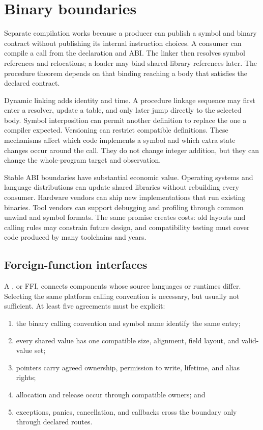 \section{Binary boundaries}

Separate compilation works because a producer can publish a symbol and binary
contract without publishing its internal instruction choices. A consumer can
compile a call from the declaration and ABI. The linker then resolves symbol
references and relocations; a loader may bind shared-library references later.
The procedure theorem depends on that binding reaching a body that satisfies
the declared contract.

Dynamic linking adds identity and time. A procedure linkage sequence may first
enter a resolver, update a table, and only later jump directly to the selected
body. Symbol interposition can permit another definition to replace the one a
compiler expected. Versioning can restrict compatible definitions. These
mechanisms affect which code implements a symbol and which extra state changes
occur around the call. They do not change integer addition, but they can change
the whole-program target and observation.

Stable ABI boundaries have substantial economic value. Operating systems and
language distributions can update shared libraries without rebuilding every
consumer. Hardware vendors can ship new implementations that run existing
binaries. Tool vendors can support debugging and profiling through common
unwind and symbol formats. The same promise creates costs: old layouts and
calling rules may constrain future design, and compatibility testing must
cover code produced by many toolchains and years.

\subsection{Foreign-function interfaces}

A , or FFI, connects components whose
source languages or runtimes differ. Selecting the same platform calling
convention is necessary, but usually not sufficient. At least five agreements
must be explicit:

\begin{enumerate}
\item the binary calling convention and symbol name identify the same entry;
\item every shared value has one compatible size, alignment, field layout, and
valid-value set;
\item pointers carry agreed ownership, permission to write, lifetime, and alias rights;
\item allocation and release occur through compatible owners; and
\item exceptions, panics, cancellation, and callbacks cross the boundary only
through declared routes.
\end{enumerate}

